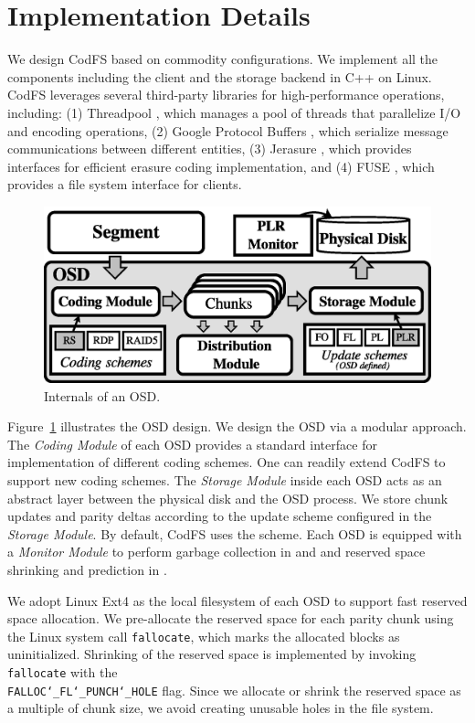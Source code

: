 \section{Implementation Details}
\label{sec:implementation}

We design CodFS based on commodity configurations. We implement all the
components including the client and the storage backend in C++ on Linux.
CodFS leverages several third-party libraries for high-performance operations,
including: (1) Threadpool \cite{boosttp}, which manages a pool of threads that
parallelize I/O and encoding operations, (2) Google Protocol Buffers
\cite{protobuf}, which serialize message communications between different
entities, (3) Jerasure \cite{plank09}, which provides interfaces for
efficient erasure coding implementation, and (4) FUSE \cite{fuse}, which
provides a file system interface for clients.

\begin{figure}[t]
 \centering
 \includegraphics[width=0.9\linewidth]{figs/osd_implement}
 \vspace{-3pt}
 \caption{Internals of an OSD.}
 \label{fig:osd_implement}
\end{figure}

Figure~\ref{fig:osd_implement} illustrates the OSD design. 
We design the OSD via a modular approach. The \textit{Coding Module} of 
each OSD provides a standard interface for implementation of different coding
schemes.  One can readily extend CodFS to support new coding schemes.
The \textit{Storage Module} inside each OSD acts as an abstract layer between
the physical disk and the OSD process.  We store chunk updates and parity
deltas according to the update scheme configured in the \textit{Storage
Module}.  By default, CodFS uses the \PLR scheme. Each OSD is equipped with
a \textit{Monitor Module} to perform garbage collection in \FL and \PL and
reserved space shrinking and prediction in \PLR.

We adopt Linux Ext4 as the local filesystem of each OSD to support fast
reserved space allocation.  We pre-allocate the reserved space for each parity
chunk using the Linux system call \texttt{fallocate}, which marks the
allocated blocks as uninitialized. 
Shrinking of the reserved space is implemented by invoking \texttt{fallocate}
with the \\ \texttt{FALLOC\char`_FL\char`_PUNCH\char`_HOLE} flag. Since we
allocate or shrink the reserved space as a multiple of chunk size, we avoid
creating unusable holes in the file system.

